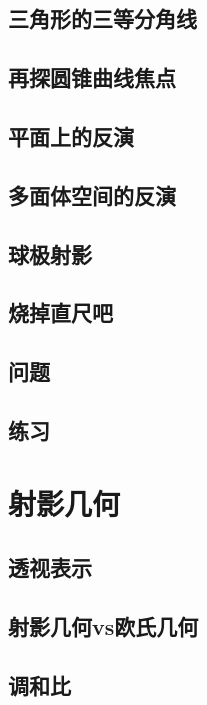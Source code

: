 \documentclass[cn,fancy,blue,11pt]{elegantbook}
\begin{document}
\section{三角形的三等分角线}

\section{再探圆锥曲线焦点}

\section{平面上的反演}

\section{多面体空间的反演}

\section{球极射影}

\section{烧掉直尺吧}

\section{问题}

\section{练习}

\chapter{射影几何}

\section{透视表示}

\section{射影几何vs欧氏几何}

\section{调和比}
\end{document}
